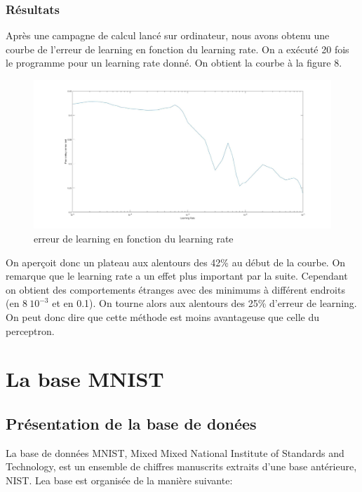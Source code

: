 \documentclass[a4paper,oneside]{report}
\begin{document}
\subsection{Résultats}

Après une campagne de calcul lancé sur ordinateur, nous avons obtenu une courbe de l'erreur de learning en fonction du learning rate. On a exécuté 20 fois le programme pour un learning rate donné. On obtient la courbe à la figure 8.

\begin{figure}[!h]
	\begin{center}
		\includegraphics[scale=0.27]{Images/courbe_discriminative.jpg} 
		\caption{erreur de learning en fonction du learning rate} 
	\end{center}
\end{figure}

On aperçoit donc un plateau aux alentours des 42\% au début de la courbe. On remarque que le learning rate a un effet plus important par la suite. Cependant on obtient des comportements étranges avec des minimums à différent endroits (en $8 \ 10^{-3}$ et en 0.1). On tourne alors aux alentours des 25\% d'erreur de learning. On peut donc dire que cette méthode est moins avantageuse que celle du perceptron.

    \appendix

    \chapter{La base MNIST}

            \section{Présentation de la base de donées}

                La base de données MNIST, Mixed Mixed National Institute of Standards and Technology, 
est un ensemble de chiffres manuscrits extraits d'une base antérieure, NIST. Lea base 
est organisée de la manière 
suivante:
\end{document}
